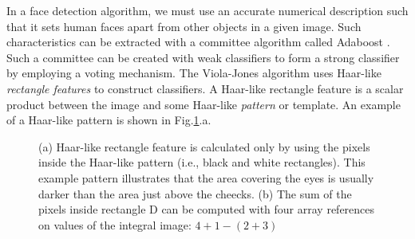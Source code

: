 \documentclass[conference]{IEEEtran}
\begin{document}
In a face detection algorithm, we must use an accurate numerical description such that it sets human faces apart from other objects in a given image.
Such characteristics can be extracted with a committee algorithm called Adaboost \cite{adaboost-1997}. Such a committee can be created with weak classifiers to form a strong classifier by employing a voting mechanism. The Viola-Jones algorithm \cite{viola-2001} uses Haar-like {\it rectangle features} to construct classifiers. 
A Haar-like rectangle feature is a scalar product between the image and some Haar-like {\it pattern} or template.  
An example of a Haar-like pattern is shown in Fig.\ref{fig_haar_example}.a.


\begin{figure}[!htb]
\centering
{}
\caption{(a) Haar-like rectangle feature is calculated only by using the pixels inside the Haar-like pattern (i.e., black and white rectangles). This example pattern illustrates that the area covering the eyes is usually darker than the area just above the cheecks. (b) The sum of the pixels inside rectangle D can be computed with four array references on values of the integral image: $4+1-(2+3)$}
\label{fig_haar_example}
\end{figure}
\end{document}
